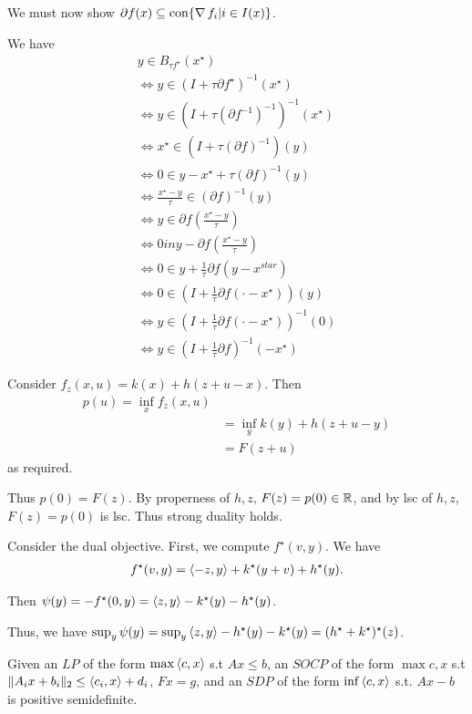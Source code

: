 \begin{exercises}
  We must now show $\partial f(x) \subseteq \operatorname*{con} \{ \operatorname*{\nabla} f_{i} | i \in I(x) \}$.
\item
  We have
  \begin{align}
    \label{eq:43}
    y \in B_{\tau f^{\star}}(x^{\star}) \\
    \iff y \in (I + \tau \partial f^{\star})^{-1}(x^{\star}) \\
    \iff y \in (I + \tau (\partial f^{-1})^{-1})^{-1}(x^{\star}) \\
    \iff x^{\star} \in (I + \tau (\partial f)^{-1})(y) \\
    \iff 0 \in y - x^{\star} + \tau (\partial f)^{-1}(y) \\
    \iff \frac{x^{\star} - y}{\tau} \in (\partial f)^{-1}(y) \\
    \iff y \in \partial f (\frac{x^{\star} -y}{\tau}) \\
    \iff 0 in y - \partial f(\frac{x^{\star}-y}{\tau}) \\
    \iff 0 \in y + \frac{1}{\tau} \partial f(y - x^{star}) \\
    \iff 0 \in (I + \frac{1}{\tau} \partial f(\cdot - x^{\star}))(y) \\
    \iff y \in (I + \frac{1}{\tau} \partial f(\cdot - x^{\star}))^{-1}(0) \\
    \iff y \in (I + \frac{1}{\tau} \partial f)^{-1}(-x^{\star})
  \end{align}
\item
  Consider $f_{z}(x, u) = k(x) + h(z + u -x)$.  Then
  \begin{align}
    \label{eq:44}
    p(u) = \inf_{x} f_{z}(x, u) \\
    &= \inf_{y} k(y) + h(z + u - y) \\
    &= F(z + u)
  \end{align} as required.

  Thus $p(0) = F(z)$. By properness of $h, z$, $F(z) = p(0) \in \mathbb{R}$,
  and by lsc of $h, z$, $F(z) = p(0)$ is lsc.  Thus strong duality
  holds.

  Consider the dual objective.  First, we compute $f^{\star}(v, y)$.
  We have
  \begin{align}
    \label{eq:45}
    f^{\star}(v, y) = \IP{-z, y} + k^{\star}(y + v) + h^{\star}(y).  
  \end{align}

  Then $\psi(y) = - f^{\star}(0, y) = \IP{z, y} - k^{\star}(y) -
  h^{\star}(y)$.

  Thus, we have $\sup_{y} \psi(y) = \sup_{y} \IP{z, y} - h^{\star}(y)
  - k^{\star}(y) = (h^{\star} + k^{\star})^{\star}(z)$.
\item
  Given an $LP$ of the form $\max \IP{c, x}$ s.t $Ax \leq b$, an
  $SOCP$ of the form $\max {c, x}$ s.t $\| A_{i} x + b_{i}\|_{2} \leq
  \IP{c_{i}, x} + d_{i}$, $Fx = g$, and an $SDP$ of the form $\inf
  \IP{c, x}$ s.t. $Ax - b$ is positive semidefinite.


\end{exercises}
